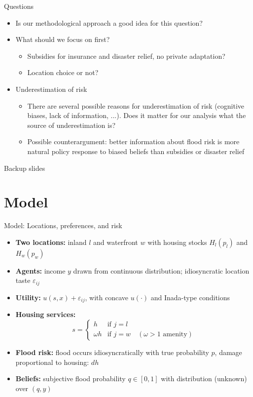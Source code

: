 \documentclass[xcolor=dvipsnames, aspectratio = 169]{beamer}
\begin{document}
{\begin{frame}{Questions}
  \begin{itemize}
    \item Is our methodological approach a good idea for this question?
    \item What should we focus on first?
    \begin{itemize}
      \item Subsidies for insurance and disaster relief, no private adaptation?
      \item Location choice or not?
    \end{itemize}
    \item Underestimation of risk
    \begin{itemize}
      \item There are several possible reasons for underestimation of risk (cognitive biases, lack of information, ...). Does it matter for our analysis what the source of underestimation is?
      \item Possible counterargument: better information about flood risk is more natural policy response to biased beliefs than subsidies or disaster relief
    \end{itemize}
  \end{itemize}
\end{frame}


\begin{frame}{Backup slides}
\end{frame}

\section{Model}

\begin{frame}{Model: Locations, preferences, and risk}
\begin{itemize}[leftmargin=0.0cm]
    \setlength{\itemsep}{0.3cm}
    \item[] \textbf{Two locations:} inland $l$ and waterfront $w$ with housing stocks $H_l(p_l)$ and $H_w(p_w)$
\item[] \textbf{Agents:} income $y$ drawn from continuous distribution; idiosyncratic location taste $\varepsilon_{ij}$
\item[] \textbf{Utility:} $u(s,x) + \varepsilon_{ij}$, with concave $u(\cdot)$ and Inada-type conditions
\item[] \textbf{Housing services:}
\[
s =
\begin{cases}
h & \text{if } j=l \\
\omega h & \text{if } j=w \quad (\omega>1 \text{ amenity})
\end{cases}
\]
\item[] \textbf{Flood risk:} flood occurs idiosyncratically with true probability $p$, damage proportional to housing: $dh$
\item[] \textbf{Beliefs:} subjective flood probability $q\in[0,1]$ with distribution (unknown) over $(q,y)$
\end{itemize}
\end{frame}

}
\end{document}

